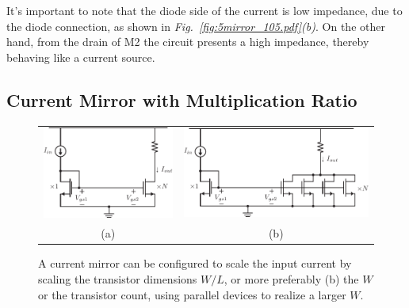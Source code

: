 It's important to note that the diode side of the current is low impedance, due to the diode connection, as shown in \emph{Fig.~\ref{fig:5mirror_105.pdf}(b)}.  On the other hand, from the drain of M2 the circuit presents a high impedance, thereby behaving like a current source.
\subsection{Current Mirror with Multiplication Ratio} \label{sec:interdigitate}
\begin{figure}[tb]
\centering
\begin{tabular}{cc}
\includegraphics[scale=.8]{6mirror_105_amp.pdf} &
\includegraphics[scale=.8]{6mirror_105_amp_Ncopies.pdf}\\
(a) & (b)\\
\end{tabular}
\caption{A current mirror can be configured to scale the input current by scaling the transistor dimensions $W/L$, or more preferably (b) the $W$ or the transistor count, using parallel devices to realize a larger $W$.}
\label{fig:6mirror_105_amp.pdf}
\end{figure}
